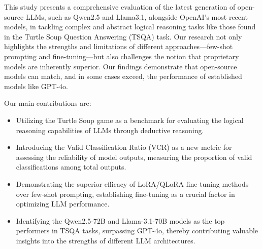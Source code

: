 \documentclass[conference]{IEEEtran}
\begin{document}
This study presents a comprehensive evaluation of the latest generation of open-source LLMs, such as Qwen2.5 and Llama3.1, alongside OpenAI's most recent models, in tackling complex and abstract logical reasoning tasks like those found in the Turtle Soup Question Answering (TSQA) task. Our research not only highlights the strengths and limitations of different approaches—few-shot prompting and fine-tuning—but also challenges the notion that proprietary models are inherently superior. Our findings demonstrate that open-source models can match, and in some cases exceed, the performance of established models like GPT-4o.

Our main contributions are:
\begin{itemize}
    \item Utilizing the Turtle Soup game as a benchmark for evaluating the logical reasoning capabilities of LLMs through deductive reasoning.
    
    \item Introducing the Valid Classification Ratio (VCR) as a new metric for assessing the reliability of model outputs, measuring the proportion of valid classifications among total outputs.

    \item Demonstrating the superior efficacy of LoRA/QLoRA fine-tuning methods over few-shot prompting, establishing fine-tuning as a crucial factor in optimizing LLM performance.

    \item Identifying the Qwen2.5-72B and Llama-3.1-70B models as the top performers in TSQA tasks, surpassing GPT-4o, thereby contributing valuable insights into the strengths of different LLM architectures.
\end{itemize}



 
\end{document}
